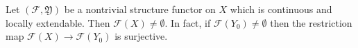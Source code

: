 Let $(\mathcal{F}, \mathfrak{Y})$ be a nontrivial structure functor on $X$ which is continuous and locally extendable. Then $\mathcal{F}(X) \neq \emptyset$. In fact, if $\mathcal{F}(Y_0) \neq \emptyset$ then the restriction map $\mathcal{F}(X) \to \mathcal{F}(Y_0)$ is surjective.
